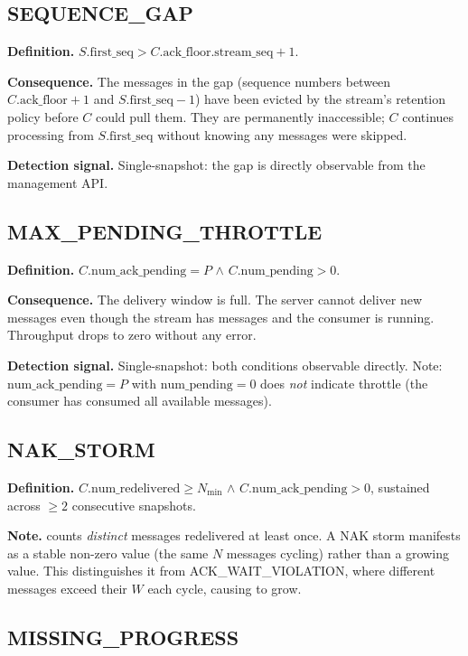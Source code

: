 \documentclass[journal]{IEEEtran}
\begin{document}
\subsection{SEQUENCE\_GAP}

\textbf{Definition.} $S.\text{first\_seq} > C.\text{ack\_floor.stream\_seq} + 1$.

\textbf{Consequence.} The messages in the gap (sequence numbers between
$C.\text{ack\_floor} + 1$ and $S.\text{first\_seq} - 1$) have been evicted
by the stream's retention policy before $C$ could pull them. They are
permanently inaccessible; $C$ continues processing from
$S.\text{first\_seq}$ without knowing any messages were skipped.

\textbf{Detection signal.} Single-snapshot: the gap is directly observable
from the management API.

\subsection{MAX\_PENDING\_THROTTLE}

\textbf{Definition.} $C.\text{num\_ack\_pending} = P$ $\wedge$
$C.\text{num\_pending} > 0$.

\textbf{Consequence.} The delivery window is full. The server cannot deliver
new messages even though the stream has messages and the consumer is running.
Throughput drops to zero without any error.

\textbf{Detection signal.} Single-snapshot: both conditions observable directly.
Note: $\text{num\_ack\_pending} = P$ with $\text{num\_pending} = 0$ does
\emph{not} indicate throttle (the consumer has consumed all available messages).

\subsection{NAK\_STORM}

\textbf{Definition.} $C.\text{num\_redelivered} \geq N_\text{min}$
$\wedge$ $C.\text{num\_ack\_pending} > 0$, sustained across
$\geq 2$ consecutive snapshots.

\textbf{Note.}  counts \emph{distinct} messages
redelivered at least once. A NAK storm manifests as a stable non-zero
value (the same $N$ messages cycling) rather than a growing value.
This distinguishes it from ACK\_WAIT\_VIOLATION, where different messages
exceed their $W$ each cycle, causing  to grow.

\subsection{MISSING\_PROGRESS}
\end{document}
